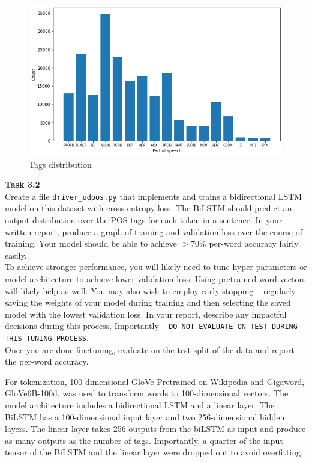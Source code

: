\documentclass[12pt,article]{article}
\newenvironment{task}[2][Task]
    { \begin{mdframed}[backgroundcolor=gray!20] \textbf{#1 #2} \\}
    {  \end{mdframed}}
\begin{document}
\begin{figure}[H]
    \centering
    \includegraphics[scale=0.5]{tags_dist.png} \par
    \caption{Tags distribution}
    \label{fig:tag-dist}
\end{figure}


\newpage
\begin{task}{3.2} 
Create a file \texttt{driver\_udpos.py} that implements and trains a bidirectional LSTM model on this dataset with cross entropy loss. The BiLSTM should predict an output distribution over the POS tags for each token in a sentence. In your written report, produce a graph of training and validation loss over the course of training. Your model should be able to achieve $>70\%$ per-word accuracy fairly easily. \\[5pt] 

To achieve stronger performance, you will likely need to tune hyper-parameters or model architecture to achieve lower validation loss. Using pretrained word vectors will likely help as well. You may also wish to employ early-stopping -- regularly saving the weights of your model during training and then selecting the saved model with the lowest validation loss. In your report, describe any impactful decisions during this process. Importantly -- \texttt{DO NOT EVALUATE ON TEST DURING THIS TUNING PROCESS}.\\[5pt]

Once you are done finetuning, evaluate on the test split of the data and report the per-word accuracy. 
\end{task}

For tokenization, 100-dimensional GloVe Pretrained on Wikipedia and Gigaword, GloVe6B-100d, was used to transform words to 100-dimensional vectors. The model architecture includes a bidirectional LSTM and a linear layer. The BiLSTM has a 100-dimensional input layer and two 256-dimensional hidden layers. The linear layer takes 256 outputs from the biLSTM as input and produce as many outputs as the number of tags. Importantly, a quarter of the input tensor of the BiLSTM and the linear layer were dropped out to avoid overfitting.
\end{document}
